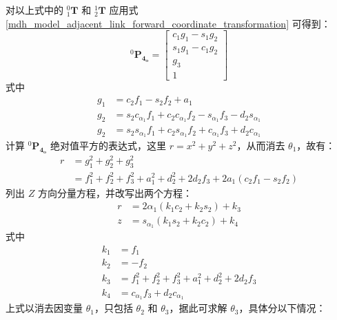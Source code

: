 \documentclass[cn,11pt,chinese,blue,bibstyle=ieeetr]{elegantbook}
\begin{document}
对以上式中的 ${_1^0\bm{T}}$ 和 ${_2^1\bm{T}}$ 应用式 \ref{mdh_model_adjacent_link_forward_coordinate_transformation} 可得到：
\begin{equation}
	{^0\bm{P_{4_o}}} = \begin{bmatrix}
		c_1g_1 - s_1g_2 \\
		s_1g_1 - c_1g_2 \\
		g_3 \\
		1
	\end{bmatrix}
\end{equation}
式中
\begin{equation}
\begin{aligned}
g_1 &= c_2f_1 - s_2f_2 + a_1 \\
g_2 &= s_2c_{\alpha_1}f_1 + c_2c_{\alpha_1}f_2 - s_{\alpha_1}f_3 - d_2s_{\alpha_1} \\
g_2 &= s_2s_{\alpha_1}f_1 + c_2s_{\alpha_1}f_2 + c_{\alpha_1}f_3 + d_2c_{\alpha_1}
\end{aligned}
\end{equation}
计算 ${^0\bm{P_{4_o}}}$ 绝对值平方的表达式，这里 $r=x^2 + y^2 + z^2$，从而消去 $\theta_1$，故有：
\begin{equation}
\begin{aligned}
r &= g_1^2 + g_2^2 + g_3^2 \\
&= f_1^2 + f_2^2 + f_3^2 + a_1^2 + d_2^2 + 2d_2f_3 + 2a_1(c_2f_1 - s_2f_2)
\end{aligned}
\end{equation}
列出 $Z$ 方向分量方程，并改写出两个方程：
\begin{equation}
\begin{aligned}
r &= 2\alpha_1\left(k_1c_2 + k_2s_2 \right) + k_3 \\
z &= s_{\alpha_1}\left(k_1s_2 + k_2c_2 \right) + k_4
\end{aligned}
\end{equation}
式中
\begin{equation}
	\begin{aligned}
		k_1 &= f_1 \\
		k_2 &= -f_2 \\
		k_3 &= f_1^2 + f_2^2 + f_3^2 + a_1^2 + d_2^2 + 2d_2f_3 \\
		k_4 &= c_{\alpha_1}f_3 + d_2c_{\alpha_1}
	\end{aligned}
\end{equation}
上式以消去因变量 $\theta_1$，只包括 $\theta_2$ 和 $\theta_3$，据此可求解 $\theta_3$，具体分以下情况：
\end{document}
